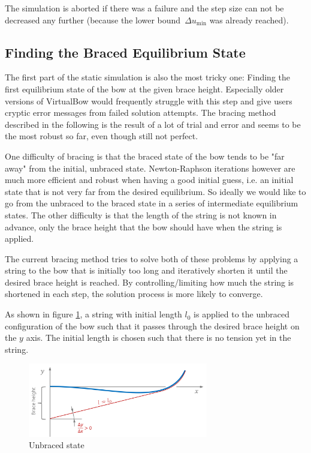 The simulation is aborted if there was a failure and the step size can not be decreased any further (because the lower bound~$\Delta u_\mathrm{min}$ was already reached).

\newpage
\subsection{Finding the Braced Equilibrium State}

The first part of the static simulation is also the most tricky one: Finding the first equilibrium state of the bow at the given brace height.
Especially older versions of VirtualBow would frequently struggle with this step and give users cryptic error messages from failed solution attempts.
The bracing method described in the following is the result of a lot of trial and error and seems to be the most robust so far, even though still not perfect.

One difficulty of bracing is that the braced state of the bow tends to be "far away" from the initial, unbraced state.
Newton-Raphson iterations however are much more efficient and robust when having a good initial guess, i.e. an initial state that is not very far from the desired equilibrium.
So ideally we would like to go from the unbraced to the braced state in a series of intermediate equilibrium states.
The other difficulty is that the length of the string is not known in advance, only the brace height that the bow should have when the string is applied.

The current bracing method tries to solve both of these problems by applying a string to the bow that is initially too long and iteratively shorten it until the desired brace height is reached.
By controlling/limiting how much the string is shortened in each step, the solution process is more likely to converge.

As shown in figure \ref{fig:bracing-method-1}, a string with initial length $l_{0}$ is applied to the unbraced configuration of the bow such that it passes through the desired brace height on the $y$ axis.
The initial length is chosen such that there is no tension yet in the string.

\begin{figure}[h]
\centering
\includegraphics[width=0.7\textwidth]{figures/solution/bracing-method-1}
\caption{Unbraced state}
\label{fig:bracing-method-1}
\end{figure}

